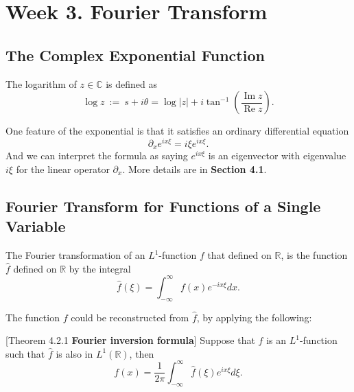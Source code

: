 \section{Week 3. Fourier  Transform}

\subsection{The Complex Exponential Function}
\begin{Definition}
    The logarithm of $z\in\mathbb C$ is defined as 
\[\log z ~:=~ s+i\theta=\log |z|+i\tan^{-1}\left(\frac{\operatorname{Im} z}{\operatorname{Re} z}\right).\]
\end{Definition}
One feature of the exponential is that it satisfies an ordinary differential equation
\[\partial_x e^{ix\xi}=i\xi e^{ix\xi}.\]
And we can interpret the formula as saying $e^{ix\xi}$ is an eigenvector with eigenvalue $i\xi$ for the linear operator $\partial_x$.
More details are in \textbf{Section 4.1}.






\subsection{Fourier Transform for Functions of a Single Variable}
\begin{Definition}
    The Fourier transformation of an $L^1$-function $f$ that defined on $\mathbb R$, is the function $\hat{f}$ defined on $\mathbb R$ by the integral
    \[\hat{f}(\xi)=\int_{-\infty}^{\infty}f(x)e^{-ix\xi}dx.\]
\end{Definition}



The function $f$ could be reconstructed from  $\hat{f}$, by applying the following:

\begin{Theorem}\label{thm_Finversion}[Theorem 4.2.1 \textbf{Fourier inversion formula}]
    Suppose that $f$ is an $L^1$-function such that $\hat{f}$ is also in $L^1(\mathbb R)$, then 
    \begin{equation}\label{eq_Finverse}
        f(x)=\frac{1}{2\pi}\int_{-\infty}^{\infty}\hat{f}(\xi)e^{ix\xi}d\xi.
    \end{equation}
\end{Theorem}

